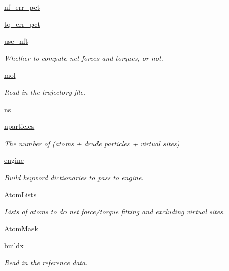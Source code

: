 \begin{DoxyCompactItemize}
\hyperlink{classsrc_1_1abinitio_1_1AbInitio_a81b9a3e15cf6c8d7cbf35ebd5662e6bc}{nf\+\_\+err\+\_\+pct}
\item 
\hyperlink{classsrc_1_1abinitio_1_1AbInitio_ac780a1a084ef789ee064331988263242}{tq\+\_\+err\+\_\+pct}
\item 
\hyperlink{classsrc_1_1abinitio_1_1AbInitio_a751af39fbd241badec09dd0214902d49}{use\+\_\+nft}
\begin{DoxyCompactList}\small\item\em Whether to compute net forces and torques, or not. \end{DoxyCompactList}\item 
\hyperlink{classsrc_1_1abinitio_1_1AbInitio_ae9dcad17db7b29f0aba942914cc25976}{mol}
\begin{DoxyCompactList}\small\item\em Read in the trajectory file. \end{DoxyCompactList}\item 
\hyperlink{classsrc_1_1abinitio_1_1AbInitio_a5d953e461f019cf088728fe835213fb8}{ns}
\item 
\hyperlink{classsrc_1_1abinitio_1_1AbInitio_aec7479553c66ace03a185d838fd26a5e}{nparticles}
\begin{DoxyCompactList}\small\item\em The number of (atoms + drude particles + virtual sites) \end{DoxyCompactList}\item 
\hyperlink{classsrc_1_1abinitio_1_1AbInitio_a5501a9f620a2dc65cf16f22d6f86c3aa}{engine}
\begin{DoxyCompactList}\small\item\em Build keyword dictionaries to pass to engine. \end{DoxyCompactList}\item 
\hyperlink{classsrc_1_1abinitio_1_1AbInitio_af600fbf9c649505ab9de7d4a132a9493}{Atom\+Lists}
\begin{DoxyCompactList}\small\item\em Lists of atoms to do net force/torque fitting and excluding virtual sites. \end{DoxyCompactList}\item 
\hyperlink{classsrc_1_1abinitio_1_1AbInitio_af60e2adac5dd3b79b1c368c4507ff623}{Atom\+Mask}
\item 
\hyperlink{classsrc_1_1abinitio_1_1AbInitio_a01471cb04776812a1ac6fbdaef5c4152}{buildx}
\begin{DoxyCompactList}\small\item\em Read in the reference data. \end{DoxyCompactList}\item 

\end{DoxyCompactItemize}
